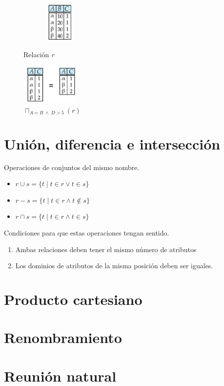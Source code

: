 \documentclass[12pt,a4paper]{report}
\begin{document}
		\begin{figure}[htb]
				\centering
				\includegraphics[width=4cm, height=2cm]{./imagenes/proyeccion1.png}
				\caption{Relación \textit{r}}
				\includegraphics[width=3cm, height=2cm]{./imagenes/proyeccion2.png}
				\caption{$\sqcap_{A=B \; \land \; D > 5}(r)$}
		\end{figure}
	
	\section{Unión, diferencia e intersección}
		\par Operaciones de conjuntos del mismo nombre.
		\begin{itemize}
			\item $r \cup s = \lbrace t \; | \; t \in r \lor t \in s \rbrace$
			\item $r - s = \lbrace t \; | \; t \in r \land t \notin s \rbrace$
			\item $r \cap s = \lbrace t \; | \; t \in r \land t \in s \rbrace$
		\end{itemize}
		\par Condiciones para que estas operaciones tengan sentido.
		\begin{enumerate}
			\item Ambas relaciones deben tener el mismo número de atributos
			\item Los dominios de atributos de la misma posición deben ser iguales.
		\end{enumerate}

	\section{Producto cartesiano}
	
	\section{Renombramiento}

	\section{Reunión natural}
	
\end{document}
